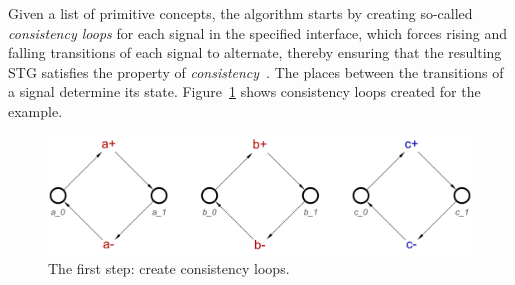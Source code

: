 \documentclass[british, journal]{IEEEtran}
\newcommand{\noun}[1]{\textsc{#1}}
\begin{document}

Given a list of primitive concepts, the algorithm starts by creating so-called
\emph{consistency loops} for each signal in the specified interface, which
forces rising
and falling transitions of each signal to alternate, thereby ensuring that the
resulting
STG satisfies the property of \emph{consistency}~\cite{Cortadella}.
The places between the transitions of a signal determine its state.
Figure~\ref{fig:step-by-step1} shows consistency loops created for the example.

\begin{figure}[h]
\begin{centering}
\includegraphics[scale=0.23]{Images/Step-by-step1}
\par
\protect\caption{\label{fig:step-by-step1}The first step: create consistency
loops.}
\vspace{-2mm}
\end{centering}
\end{figure}
\end{document}
